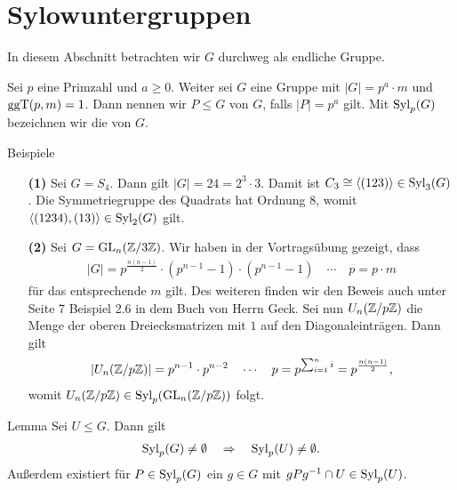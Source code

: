 \section{Sylowuntergruppen}
In diesem Abschnitt betrachten wir $ G $ durchweg als endliche Gruppe.

\begin{df}\label{skript:6.1}  
	Sei $ p $ eine Primzahl und $ a \geq 0 $. 
	Weiter sei $ G $ eine Gruppe mit $ |G| = p^a \cdot m $ und $ \operatorname{ggT}(p,m) = 1 $.
	Dann nennen wir $ P \leq G $  von $ G $, falls $ |P| = p^a $ gilt.
	Mit $ \operatorname{Syl}_p(G) $ bezeichnen wir die  von $ G $.
\end{df}

\begin{genericdf}{Beispiele}\label{skript:6.2} \ 
	\begin{enumerate}
		\item[\textbf{(1)}]
		Sei $ G = S_4 $. Dann gilt $ |G| = 24 = 2^3 \cdot 3 $.
		Damit ist $ C_3 \cong \langle (123) \rangle \in \operatorname{Syl}_3(G)$.
		Die Symmetriegruppe des Quadrats hat Ordnung $ 8 $, 
		womit $ \langle(1234),(13) \rangle \in \operatorname{Syl}_2(G)$ gilt.
		
		\item[\textbf{(2)}]
		Sei $ G  = \operatorname{GL}_n(\mathbb{Z}/ 3\mathbb{Z})$. Wir haben in der Vortragsübung gezeigt, dass
		\begin{align*}
		|G| = p^{\frac{n(n-1)}{2}} \cdot (p^{n-1} -1 ) \cdot (p^{n-1} -1 ) \quad \cdots  \quad p = p \cdot m
		\end{align*}
		für das entsprechende $ m $ gilt. Des weiteren finden wir den Beweis auch unter Seite 7 Beispiel 2.6 in dem Buch von Herrn Geck.
		Sei nun $ U_n(\mathbb{Z} / p \mathbb{Z}) $ die Menge der oberen Dreiecksmatrizen mit $ 1 $ auf den Diagonaleinträgen.
		Dann gilt
		\begin{align*}
		| U_n(\mathbb{Z} / p \mathbb{Z}) |  = p^{n-1} \cdot p^{n-2} \quad \cdots  \quad p = p^{\sum_{i=1}^n i} = p^{\frac{n(n-1)}{2}}, 
		\end{align*}
		womit $ U_n(\mathbb{Z} / p \mathbb{Z})  \in \operatorname{Syl}_p(\operatorname{GL}_n(\mathbb{Z} / p\mathbb{Z}))$ folgt.
	\end{enumerate}
\end{genericdf}

\begin{genericthm}{Lemma} \label{skript:6.3}
	Sei $U \leq G$. Dann gilt
	\begin{align*}
	\operatorname{Syl}_p(G)  \neq  \emptyset \quad \Rightarrow \quad \operatorname{Syl}_p(U) \neq \emptyset.
	\end{align*}
	Außerdem existiert für $P \in \operatorname{Syl}_p(G)$ ein $g \in G$ mit $g P g^{-1} \cap U \in \operatorname{Syl}_p(U)$.
\end{genericthm}

